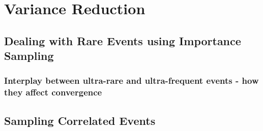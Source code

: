 \chapter{Variance Reduction}
\section{Dealing with Rare Events using Importance Sampling}
\subsection{Interplay between ultra-rare and ultra-frequent events - how they affect convergence}
\section{Sampling Correlated Events}